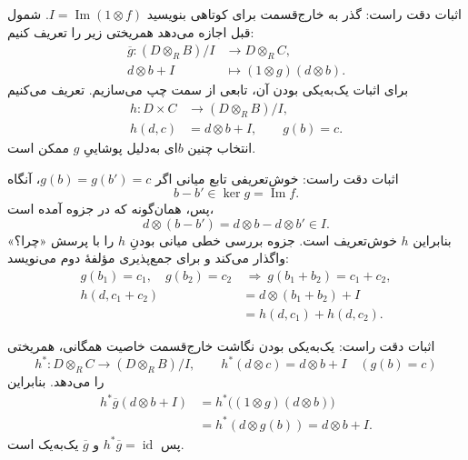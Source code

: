 \begin{frame}[t]{اثبات دقت راست: گذر به خارج‌قسمت}
    \label{lec19:right-exact-quotient}
    برای کوتاهی بنویسید $I=\operatorname{Im}(1\otimes f)$. شمول قبل اجازه می‌دهد
    همریختی زیر را تعریف کنیم:
    \[
    \begin{aligned}
        \overline g:(D\otimes_R B)/I&\longrightarrow D\otimes_R C,\\
        d\otimes b+I&\longmapsto(1\otimes g)(d\otimes b).
    \end{aligned}
    \]
    برای اثبات یک‌به‌یکی بودن آن، تابعی از سمت چپ می‌سازیم. تعریف می‌کنیم
    \[
    \begin{aligned}
        h:D\times C&\longrightarrow(D\otimes_R B)/I,\\
        h(d,c)&=d\otimes b+I,\qquad g(b)=c.
    \end{aligned}
    \]
    انتخاب چنین $b$ای به‌دلیل پوشاییِ $g$ ممکن است.
\end{frame}

\begin{frame}[t]{اثبات دقت راست: خوش‌تعریفی تابع میانی}
    \label{lec19:right-exact-well-defined}
    اگر $g(b)=g(b')=c$، آنگاه
    \[
        b-b'\in\ker g=\operatorname{Im}f.
    \]
    پس، همان‌گونه که در جزوه آمده است،
    \[
        d\otimes(b-b')=d\otimes b-d\otimes b'\in I.
    \]
    بنابراین $h$ خوش‌تعریف است. جزوه بررسی خطی میانی بودنِ $h$ را با
    پرسش «چرا؟» واگذار می‌کند و برای جمع‌پذیری مؤلفهٔ دوم می‌نویسد:
    \[
    \begin{aligned}
        g(b_1)=c_1,\quad g(b_2)=c_2
        &\ \Longrightarrow\ g(b_1+b_2)=c_1+c_2,\\
        h(d,c_1+c_2)
        &=d\otimes(b_1+b_2)+I\\
        &=h(d,c_1)+h(d,c_2).
    \end{aligned}
    \]
\end{frame}

\begin{frame}[t]{اثبات دقت راست: یک‌به‌یکی بودن نگاشت خارج‌قسمت}
    \label{lec19:right-exact-left-inverse}
    خاصیت همگانی، همریختی
    \[
        h^*:D\otimes_R C\longrightarrow(D\otimes_R B)/I,
        \qquad h^*(d\otimes c)=d\otimes b+I\quad(g(b)=c)
    \]
    را می‌دهد. بنابراین
    \[
    \begin{aligned}
        h^*\overline g(d\otimes b+I)
        &=h^*\bigl((1\otimes g)(d\otimes b)\bigr)\\
        &=h^*(d\otimes g(b))=d\otimes b+I.
    \end{aligned}
    \]
    پس $h^*\overline g=\operatorname{id}$ و $\overline g$ یک‌به‌یک است.
\end{frame}

